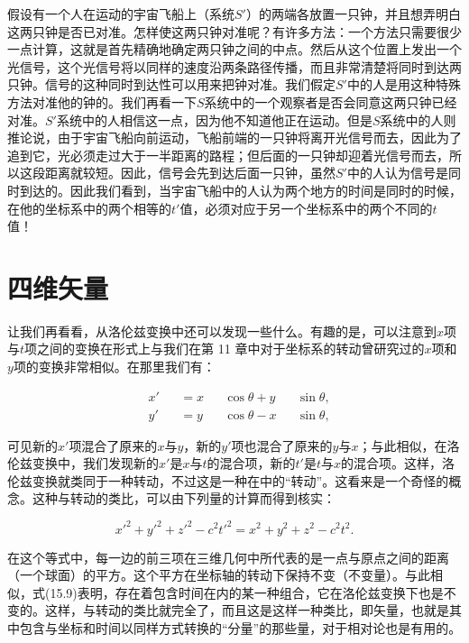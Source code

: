 \documentclass[12pt,oneside]{book}
\begin{document}
假设有一个人在运动的宇宙飞船上（系统$S'$）的两端各放置一只钟，并且想弄明白这两只钟是否已对准。怎样使这两只钟对准呢？有许多方法：一个方法只需要很少一点计算，这就是首先精确地确定两只钟之间的中点。然后从这个位置上发出一个光信号，这个光信号将以同样的速度沿两条路径传播，而且非常清楚将同时到达两只钟。信号的这种同时到达性可以用来把钟对准。我们假定$S'$中的人是用这种特殊方法对准他的钟的。我们再看一下$S$系统中的一个观察者是否会同意这两只钟已经对准。$S'$系统中的人相信这一点，因为他不知道他正在运动。但是$S$系统中的人则推论说，由于宇宙飞船向前运动，飞船前端的一只钟将离开光信号而去，因此为了追到它，光必须走过大于一半距离的路程；但后面的一只钟却迎着光信号而去，所以这段距离就较短。因此，信号会先到达后面一只钟，虽然$S'$中的人认为信号是同时到达的。因此我们看到，当宇宙飞船中的人认为两个地方的时间是同时的时候，在他的坐标系中的两个相等的$t'$值，必须对应于另一个坐标系中的两个不同的$t$值！



\section{四维矢量}
让我们再看看，从洛伦兹变换中还可以发现一些什么。有趣的是，可以注意到$x$项与$t$项之间的变换在形式上与我们在第 11 章中对于坐标系的转动曾研究过的$x$项和$y$项的变换非常相似。在那里我们有：


\begin{equation}
\begin{alignedat}{4}
&x'&&=x&&\cos\theta+y&&\sin\theta,\\
&y'&&=y&&\cos\theta-x&&\sin\theta,
\end{alignedat}
\label{Eq:I:15:8}
\end{equation}

可见新的$x'$项混合了原来的$x$与$y$，新的$y'$项也混合了原来的$y$与$x$；与此相似，在洛伦兹变换中，我们发现新的$x'$是$x$与$t$的混合项，新的$t'$是$t$与$x$的混合项。这样，洛伦兹变换就类同于一种转动，不过这是一种在中的“转动”。这看来是一个奇怪的概念。这种与转动的类比，可以由下列量的计算而得到核实：


\begin{equation}
\label{Eq:I:15:9}
x'^2\!+y'^2\!+z'^2\!-c^2t'^2\!=x^2\!+y^2\!+z^2\!-c^2t^2\!.
\end{equation}

在这个等式中，每一边的前三项在三维几何中所代表的是一点与原点之间的距离（一个球面）的平方。这个平方在坐标轴的转动下保持不变（不变量）。与此相似，式(15.9)表明，存在着包含时间在内的某一种组合，它在洛伦兹变换下也是不变的。这样，与转动的类比就完全了，而且这是这样一种类比，即矢量，也就是其中包含与坐标和时间以同样方式转换的“分量”的那些量，对于相对论也是有用的。
\end{document}
